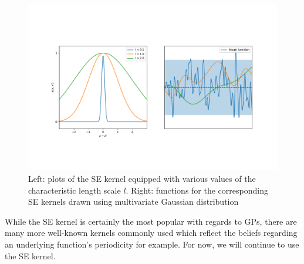 \documentclass[10pt,a4paper]{article}
\numberwithin{equation}{section}
\theoremstyle{plain}
\theoremstyle{definition}
\theoremstyle{own}
\begin{document}
\begin{figure}[H]
\centering
\includegraphics[width=1.0\textwidth]{sedraws}
\caption{Left: plots of the SE kernel equipped with various values of the characteristic length scale $l$. Right: functions for the corresponding SE kernels drawn using multivariate Gaussian distribution}
\label{figsedraws}
\end{figure}
While the SE kernel is certainly the most popular with regards to GPs, there are many more well-known kernels commonly used which reflect the beliefs regarding an underlying function's periodicity for example. For now, we will continue to use the SE kernel.
\end{document}
